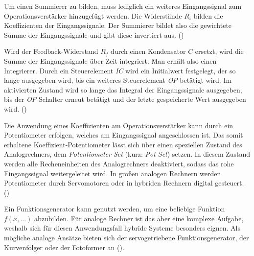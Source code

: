 Um einen Summierer zu bilden, muss lediglich ein weiteres Eingangssignal zum Operationsverstärker hinzugefügt werden. Die Widerstände \(R_i\) bilden die Koeffizienten der Eingangssignale. Der Summierer bildet also die gewichtete Summe der Eingangssignale und gibt diese invertiert aus. (\cite[vgl. S. 86]{Ulmann2022})

Wird der Feedback-Widerstand \(R_f\) durch einen Kondensator \(C\) ersetzt, wird die Summe der Eingangssignale über Zeit integriert. Man erhält also einen Integrierer. Durch ein Steuerelement \textit{IC} wird ein Initialwert festgelegt, der so lange ausgegeben wird, bis ein weiteres Steuerelement \textit{OP} betätigt wird. Im aktivierten Zustand wird so lange das Integral der Eingangssignale ausgegeben, bis der \textit{OP} Schalter erneut betätigt und der letzte gespeicherte Wert ausgegeben wird. (\cite[vgl. S. 89 ff.]{Ulmann2022})

Die Anwendung eines Koeffizienten am Operationsverstärker kann durch ein Potentiometer erfolgen, welches am Eingangssignal angeschlossen ist. Das somit erhaltene Koeffizient-Potentiometer lässt sich über einen speziellen Zustand des Analogrechners, dem \textit{Potentiometer Set} (kurz: \textit{Pot Set}) setzen. In diesem Zustand werden alle Recheneinheiten des Analogrechners deaktiviert, sodass das rohe Eingangssignal weitergeleitet wird. In großen analogen Rechnern werden Potentiometer durch Servomotoren oder in hybriden Rechnern digital gesteuert. (\cite[vgl. S. 92 ff.]{Ulmann2022})

Ein Funktionsgenerator kann genutzt werden, um eine beliebige Funktion \(f(x,...)\) abzubilden. Für analoge Rechner ist das aber eine komplexe Aufgabe, weshalb sich für diesen Anwendungsfall hybride Systeme besonders eignen. Als mögliche analoge Ansätze bieten sich der servogetriebene Funktionsgenerator, der Kurvenfolger oder der Fotoformer an (\cite[vgl. S. 97 ff.]{Ulmann2022}).

